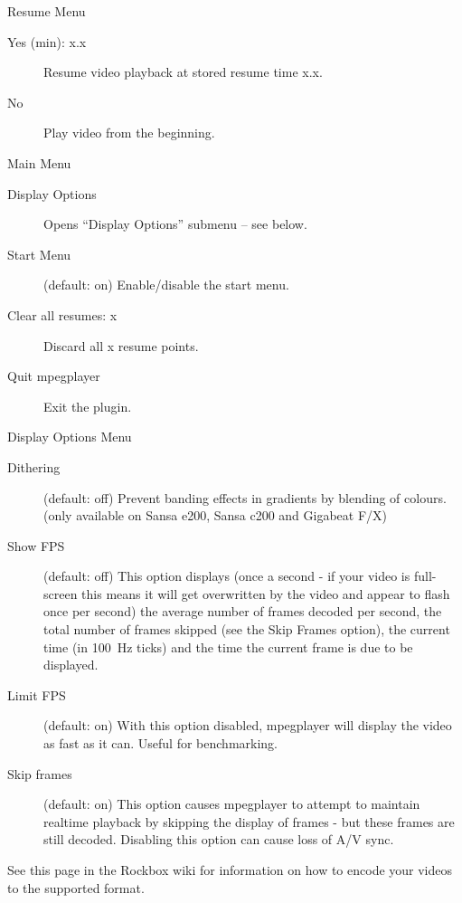 Resume Menu

\begin{description}
\item[Yes (min): x.x] Resume video playback at stored resume time x.x.
\item[No] Play video from the beginning.
\end{description}

Main Menu

\begin{description}
\item[Display Options] Opens ``Display Options'' submenu -- see below.
\item[Start Menu] (default: on) Enable/disable the start menu.
\item[Clear all resumes: x] Discard all x resume points.
\item[Quit mpegplayer] Exit the plugin.
\end{description}

Display Options Menu

\begin{description}
\item[Dithering] (default: off) Prevent banding effects in gradients by blending
    of colours. (only available on Sansa e200, Sansa c200 and Gigabeat F/X)
\item[Show FPS] (default: off) This option displays (once a second - if your
    video is full-screen this means it will get overwritten by the video and
    appear to flash once per second) the average number of frames decoded per
    second, the total number of frames skipped (see the Skip Frames option),
    the current time (in 100~Hz ticks) and the time the current frame is due to
    be displayed.
\item[Limit FPS] (default: on) With this option disabled, mpegplayer will
    display the video as fast as it can. Useful for benchmarking.
\item[Skip frames] (default: on) This option causes mpegplayer to attempt to
    maintain realtime playback by skipping the display of frames - but these
    frames are still decoded. Disabling this option can cause loss of A/V sync. 
\end{description}

See this page in the Rockbox wiki for information on how to encode your videos
to the supported format. 
